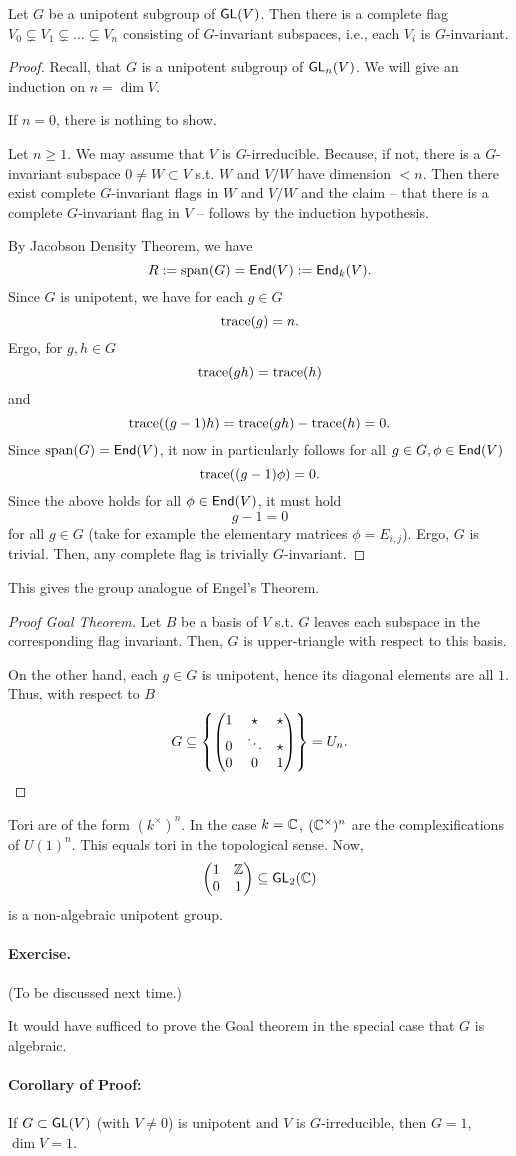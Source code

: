 \begin{proposition}
	Let $G$ be a unipotent subgroup of $\textsf{GL}(V)$. Then there is a complete flag $ V_0 \subsetneq V_1 \subsetneq \ldots \subsetneq V_n$ consisting of $G$-invariant subspaces, i.e., each $V_i$ is $G$-invariant.
\end{proposition}
\begin{proof}
Recall, that $G$ is a unipotent subgroup of $\textsf{GL}_n(V)$. We will give an induction on $n = \dim V$.

If $n = 0$, there is nothing to show.

Let $n \geq 1$. We may assume that $V$ is $G$-irreducible. Because, if not, there is a $G$-invariant subspace $0\neq W \subset V$ s.t. $W$ and $V/W$ have dimension $< n$. Then there exist complete $G$-invariant flags in $W$ and $V/W$ and the claim -- that there is a complete $G$-invariant flag in $V$ -- follows by the induction hypothesis.

By Jacobson Density Theorem, we have
\[ R := \mathrm{span}(G) = \textsf{End}(V) := \textsf{End}_k(V). \]
Since $G$ is unipotent, we have for each $g \in G$
\[ \mathrm{trace}(g) = n.\]
Ergo, for $g,h \in G$
\[ \mathrm{trace}(gh) = \mathrm{trace}(h) \]
and
\[ \mathrm{trace}((g-1)h) = \mathrm{trace}(gh) - \mathrm{trace}(h) = 0. \]
Since $\mathrm{span}(G) = \textsf{End}(V)$, it now in particularly follows for all $g \in G, \phi \in \textsf{End}(V)$
\[ \mathrm{trace}((g-1) \phi) = 0. \]
Since the above holds for all $\phi \in \textsf{End}(V)$, it must hold
\[ g-1 = 0 \]
for all $g \in G$ (take for example the elementary matrices $\phi = E_{i,j}$). Ergo, $G$ is trivial. Then, any complete flag is trivially $G$-invariant.
\end{proof}
\begin{remark}
	This gives the group analogue of Engel's Theorem.
\end{remark}
\begin{proof}[Proof Goal Theorem]
	Let $B$ be a basis of $V$ s.t. $G$ leaves each subspace in the corresponding flag invariant. Then, $G$ is upper-triangle with respect to this basis.
	
	On the other hand, each $g \in G$ is unipotent, hence its diagonal elements are all $1$. Thus, with respect to $B$
	\[ G \subseteq \left\lbrace
	\left(\begin{matrix} 1 & \star & \star\\ 0 & \ddots & \star \\ 0 & 0 & 1 \end{matrix}\right)\right\rbrace = U_n.\]
\end{proof}
\begin{remark}
	Tori are of the form $(k^\times)^n$. In the case $k = \mathbb{C}$, $(\mathbb{C}^\times)^n$ are the complexifications of $U(1)^n$. This equals tori in the topological sense. Now,
	\[
	\left(\begin{matrix} 1 & \mathbb{Z} \\ 0 & 1 \end{matrix}\right) \subseteq \textsf{GL}_2(\mathbb{C})
	 \]
	 is a non-algebraic unipotent group.
\end{remark}
\paragraph{Exercise.} (To be discussed next time.)

It would have sufficed to prove the Goal theorem in the special case that $G$ is algebraic.


\paragraph{Corollary of Proof:} If $G \subset \textsf{GL}(V)$ (with $V \neq 0$) is unipotent and $V$ is $G$-irreducible, then $G = 1$, $\dim V = 1$.
